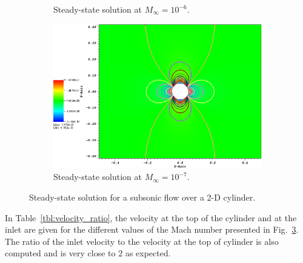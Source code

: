 \documentclass[preprint,10pt]{elsarticle}
\newcommand{\fig}[1]{Fig.~\ref{#1}}                      %
\newcommand{\tbl}[1]{Table~\ref{#1}}                     %
\begin{document}
\begin{figure}[H]
\begin{subfigure}[b]{0.495\textwidth}
                \caption{Steady-state solution at $M_\infty=10^{-6}$.}
                \label{fig:cyl_1em6}
        \end{subfigure}
        \begin{subfigure}[b]{0.495\textwidth}
                \centering
                \includegraphics[width=\textwidth]{CylinderMach1em7ZoomIn.png}
                \caption{Steady-state solution at $M_\infty=10^{-7}$.}
                \label{fig:cyl_1em7}
        \end{subfigure}
        \caption{Steady-state solution for a subsonic flow over a 2-D cylinder.}\label{fig:cylinder}
\end{figure}
%
In \tbl{tbl:velocity_ratio}, the velocity at the top of the cylinder and at the inlet are given for the different values of the Mach number presented in \fig{fig:cylinder}. The ratio of the inlet velocity to the velocity at the top of cylinder is also computed and is very close to $2$ as expected.
%
\end{document}
